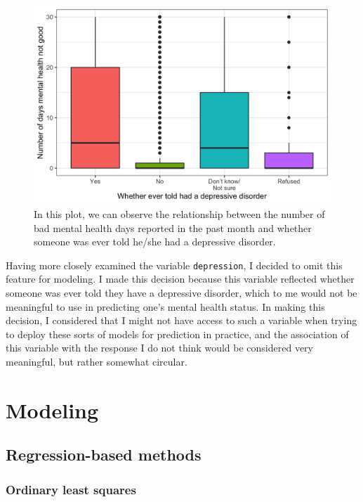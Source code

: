 \documentclass[
]{article}
\begin{document}
\begin{figure}[H]

{\centering \includegraphics[width=0.7\linewidth]{../results/mental-health-vs-depression-plot} 

}

\caption{In this plot, we can observe the relationship between the number of bad mental health days reported in the past month and whether someone was ever told he/she had a depressive disorder.}\label{fig:mental-health-vs-depression-plot}
\end{figure}

Having more closely examined the variable \texttt{depression}, I decided to omit this feature for modeling. I made this decision because this variable reflected whether someone was ever told they have a depressive disorder, which to me would not be meaningful to use in predicting one's mental health status. In making this decision, I considered that I might not have access to such a variable when trying to deploy these sorts of models for prediction in practice, and the association of this variable with the response I do not think would be considered very meaningful, but rather somewhat circular.

\hypertarget{modeling}{%
\section{Modeling}\label{modeling}}

\hypertarget{regression-based-methods}{%
\subsection{Regression-based methods}\label{regression-based-methods}}

\hypertarget{ordinary-least-squares}{%
\subsubsection{Ordinary least squares}\label{ordinary-least-squares}}
\end{document}
